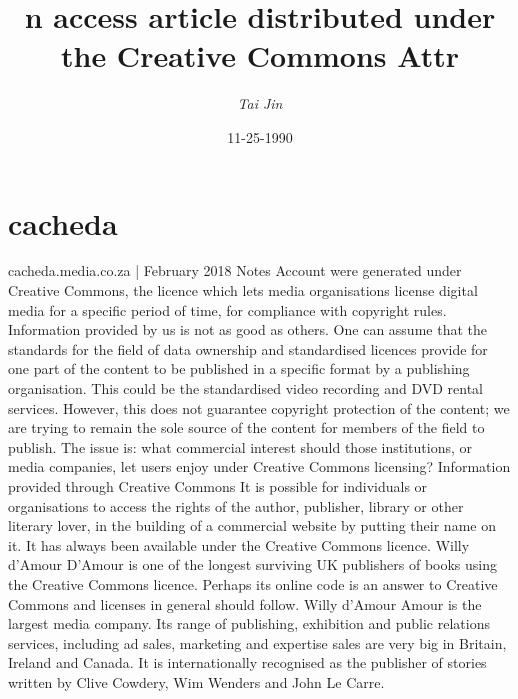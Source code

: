 \documentclass{article}%
\title{n access article distributed under the Creative Commons Attr}%
\author{\textit{Tai Jin}}%
\date{11-25-1990}%
\begin{document}
%
\normalsize%
\maketitle%
\section{cacheda}%
\label{sec:cacheda}%
cacheda.media.co.za | February 2018\newline%
Notes\newline%
Account were generated under Creative Commons, the licence which lets media organisations license digital media for a specific period of time, for compliance with copyright rules.\newline%
Information provided by us is not as good as others. One can assume that the standards for the field of data ownership and standardised licences provide for one part of the content to be published in a specific format by a publishing organisation. This could be the standardised video recording and DVD rental services. However, this does not guarantee copyright protection of the content; we are trying to remain the sole source of the content for members of the field to publish.\newline%
The issue is: what commercial interest should those institutions, or media companies, let users enjoy under Creative Commons licensing?\newline%
Information provided through Creative Commons\newline%
It is possible for individuals or organisations to access the rights of the author, publisher, library or other literary lover, in the building of a commercial website by putting their name on it. It has always been available under the Creative Commons licence.\newline%
Willy d'Amour\newline%
D'Amour is one of the longest surviving UK publishers of books using the Creative Commons licence. Perhaps its online code is an answer to Creative Commons and licenses in general should follow.\newline%
Willy d'Amour\newline%
Amour is the largest media company. Its range of publishing, exhibition and public relations services, including ad sales, marketing and expertise sales are very big in Britain, Ireland and Canada. It is internationally recognised as the publisher of stories written by Clive Cowdery, Wim Wenders and John Le Carre.\newline%
\end{document}
